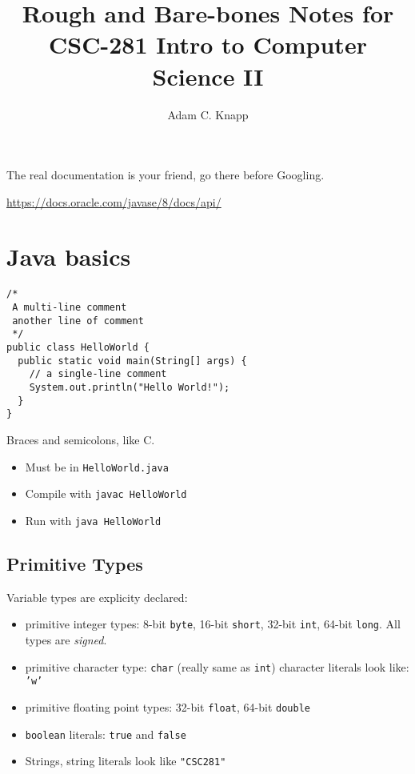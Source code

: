 \documentclass[11pt,letterpaper]{amsart}
\title[CSC-281]%
{Rough and Bare-bones Notes for\\CSC-281 Intro to Computer Science II}
\author[A. C. K.]{Adam C. Knapp}
\begin{document}
\ifpdf
{}
\else
{}
\fi



\maketitle

The real documentation is your friend, go there before Googling.
\begin{center}
  \url{https://docs.oracle.com/javase/8/docs/api/}
\end{center}
\section{Java basics}

\begin{verbatim}
/*
 A multi-line comment
 another line of comment
 */ 
public class HelloWorld {
  public static void main(String[] args) {
    // a single-line comment
    System.out.println("Hello World!");
  }
}
\end{verbatim}

Braces and semicolons, like C.

\begin{itemize}
\item Must be in \texttt{HelloWorld.java}
\item Compile with \texttt{javac HelloWorld}
\item Run with \texttt{java HelloWorld}
\end{itemize}

\subsection{Primitive Types}

Variable types are explicity declared:
\begin{itemize}
\item primitive integer types: 8-bit \texttt{byte}, 16-bit
  \texttt{short}, 32-bit \texttt{int}, 64-bit \texttt{long}. All types
  are {\em signed}.
\item primitive character type: \texttt{char} (really same as
  \texttt{int}) character literals look like: \texttt{'w'}
\item primitive floating point types: 32-bit \texttt{float}, 64-bit
  \texttt{double}
\item \texttt{boolean} literals: \texttt{true} and \texttt{false}
\item Strings, string literals look like \texttt{"CSC281"}
\end{itemize}
\end{document}
